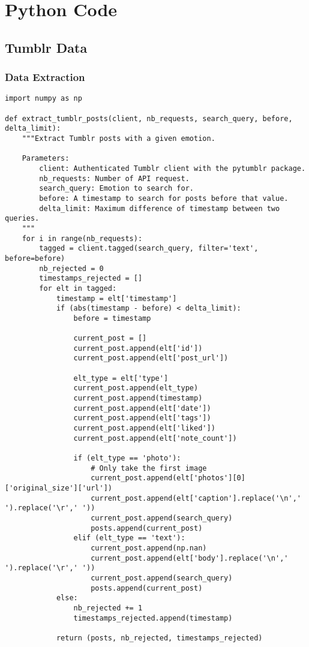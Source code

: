 \appendix
\setcounter{chapter}{0}
\chapter{Python Code}
\lstset{language=Python}
\lstset{frame=lines}
\lstset{basicstyle=\scriptsize}
\lstset{showstringspaces=false}

\section{Tumblr Data}

\subsection{Data Extraction}
\begin{lstlisting}
import numpy as np

def extract_tumblr_posts(client, nb_requests, search_query, before, delta_limit):
    """Extract Tumblr posts with a given emotion.
    
    Parameters:
        client: Authenticated Tumblr client with the pytumblr package.
        nb_requests: Number of API request.
        search_query: Emotion to search for.
        before: A timestamp to search for posts before that value.
        delta_limit: Maximum difference of timestamp between two queries.
    """    
    for i in range(nb_requests):
        tagged = client.tagged(search_query, filter='text', before=before)
        nb_rejected = 0
        timestamps_rejected = []
        for elt in tagged:
            timestamp = elt['timestamp']
            if (abs(timestamp - before) < delta_limit):
                before = timestamp

                current_post = []
                current_post.append(elt['id'])
                current_post.append(elt['post_url'])

                elt_type = elt['type']
                current_post.append(elt_type)
                current_post.append(timestamp)
                current_post.append(elt['date'])
                current_post.append(elt['tags'])
                current_post.append(elt['liked'])
                current_post.append(elt['note_count'])

                if (elt_type == 'photo'):
                    # Only take the first image
                    current_post.append(elt['photos'][0]['original_size']['url'])
                    current_post.append(elt['caption'].replace('\n',' ').replace('\r',' '))
                    current_post.append(search_query)
                    posts.append(current_post)
                elif (elt_type == 'text'):
                    current_post.append(np.nan)
                    current_post.append(elt['body'].replace('\n',' ').replace('\r',' '))
                    current_post.append(search_query)
                    posts.append(current_post)
            else:
                nb_rejected += 1
                timestamps_rejected.append(timestamp)

            return (posts, nb_rejected, timestamps_rejected)
\end{lstlisting}

